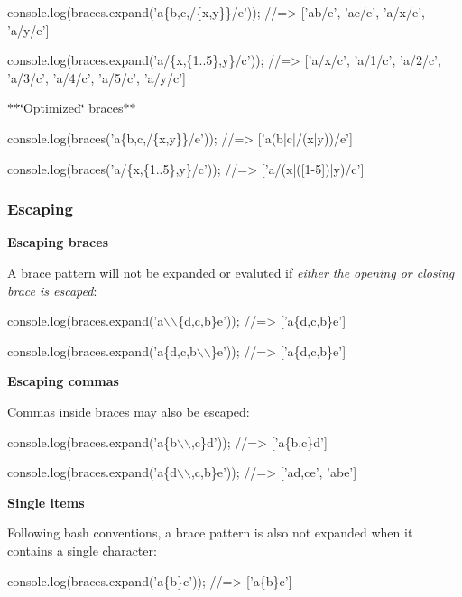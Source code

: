 \begin{DoxyCode}
console.log(braces.expand('a\{b,c,/\{x,y\}\}/e'));
//=> ['ab/e', 'ac/e', 'a/x/e', 'a/y/e']

console.log(braces.expand('a/\{x,\{1..5\},y\}/c'));
//=> ['a/x/c', 'a/1/c', 'a/2/c', 'a/3/c', 'a/4/c', 'a/5/c', 'a/y/c']
\end{DoxyCode}


$\ast$$\ast$\char`\"{}\+Optimized\char`\"{} braces$\ast$$\ast$


\begin{DoxyCode}
console.log(braces('a\{b,c,/\{x,y\}\}/e'));
//=> ['a(b|c|/(x|y))/e']

console.log(braces('a/\{x,\{1..5\},y\}/c'));
//=> ['a/(x|([1-5])|y)/c']
\end{DoxyCode}


\subsubsection*{Escaping}

{\bfseries Escaping braces}

A brace pattern will not be expanded or evaluted if {\itshape either the opening or closing brace is escaped}\+:


\begin{DoxyCode}
console.log(braces.expand('a\(\backslash\)\(\backslash\)\{d,c,b\}e'));
//=> ['a\{d,c,b\}e']

console.log(braces.expand('a\{d,c,b\(\backslash\)\(\backslash\)\}e'));
//=> ['a\{d,c,b\}e']
\end{DoxyCode}


{\bfseries Escaping commas}

Commas inside braces may also be escaped\+:


\begin{DoxyCode}
console.log(braces.expand('a\{b\(\backslash\)\(\backslash\),c\}d'));
//=> ['a\{b,c\}d']

console.log(braces.expand('a\{d\(\backslash\)\(\backslash\),c,b\}e'));
//=> ['ad,ce', 'abe']
\end{DoxyCode}


{\bfseries Single items}

Following bash conventions, a brace pattern is also not expanded when it contains a single character\+:


\begin{DoxyCode}
console.log(braces.expand('a\{b\}c'));
//=> ['a\{b\}c']
\end{DoxyCode}


